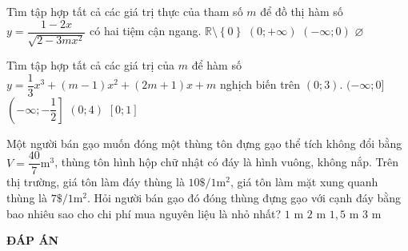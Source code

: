 \begin{ex}%
Tìm tập hợp tất cả các giá trị thực của tham số $m$ để đồ thị hàm số $y=\dfrac{1-2x}{\sqrt{2-3mx^2}}$ có hai tiệm cận ngang.
\choice
{$\mathbb{R}\setminus\left\{0\right\}$}
{$(0;+\infty)$}
{\True $(-\infty;0)$}
{$\varnothing$} 
\end{ex}

\begin{ex}%
Tìm tập hợp tất cả các giá trị của $m$ để hàm số $y=\dfrac{1}{3}x^3+(m-1)x^2+(2m+1)x+m$ nghịch biến trên $(0;3)$.
\choice
{$(-\infty;0]$}
{\True $\left(-\infty;-\dfrac{1}{2}\right]$}
{$(0;4)$}
{$[0;1]$} 
\end{ex}

\begin{ex}%
Một người bán gạo muốn đóng một thùng tôn đựng gạo thể tích không đổi bằng $V=\dfrac{40}{7}\mathrm{m}^3$, thùng tôn hình hộp chữ nhật có đáy là hình vuông, không nắp. Trên thị trường, giá tôn làm đáy thùng là $10\$/1\mathrm{m}^2$, giá tôn làm mặt xung quanh thùng là $7\$/ 1\mathrm{m}^2$. Hỏi người bán gạo đó đóng thùng đựng gạo với cạnh đáy bằng bao nhiêu sao cho chi phí mua nguyên liệu là nhỏ nhất?
\choice
{$1$ m}
{\True $2$ m}
{$1,5$ m}
{$3$ m} 
\end{ex}















\newpage
\begin{center}
	\textbf{ĐÁP ÁN}
\end{center}
\begin{multicols}{10}
	 
\end{multicols}


